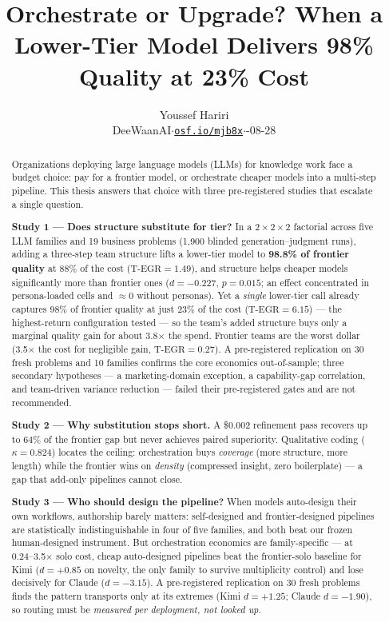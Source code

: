 \documentclass[12pt,a4paper]{article}
\title{\textbf{Orchestrate or Upgrade? When a Lower-Tier Model Delivers
98\% Quality at 23\% Cost}}
\author{Youssef Hariri\\
\small DeeWaanAI\quad $\cdot$\quad \href{https://osf.io/mjb8x}{\texttt{osf.io/mjb8x}}\quad $\cdot$\quad 2026-08-28}
\date{}
\newcommand{\TEGR}{\ensuremath{\text{T-EGR}}}
\begin{document}
\maketitle

\begin{abstract}
\noindent
Organizations deploying large language models (LLMs) for knowledge work face a
budget choice: pay for a frontier model, or orchestrate cheaper models into a
multi-step pipeline. This thesis answers that choice with three pre-registered
studies that escalate a single question.

\smallskip
\noindent\textbf{Study 1 --- Does structure substitute for tier?} In a
$2 \times 2 \times 2$ factorial across five LLM families and 19 business
problems (1{,}900 blinded generation--judgment runs), adding a three-step team
structure lifts a lower-tier model to \textbf{98.8\% of frontier quality} at
88\% of the cost ($\TEGR = 1.49$), and structure helps cheaper models
significantly more than frontier ones ($d = -0.227$, $p = 0.015$; an effect
concentrated in persona-loaded cells and $\approx 0$ without personas). Yet a
\emph{single} lower-tier call already captures 98\% of frontier quality at just
23\% of the cost ($\TEGR = 6.15$) --- the highest-return configuration tested ---
so the team's added structure buys only a marginal quality gain for about
3.8$\times$ the spend. Frontier teams are the worst dollar (3.5$\times$ the cost
for negligible gain, $\TEGR = 0.27$). A pre-registered replication on 30 fresh problems and 10 families confirms the core economics out-of-sample; three secondary hypotheses --- a marketing-domain exception, a capability-gap correlation, and team-driven variance reduction --- failed their pre-registered gates and are not recommended.

\smallskip
\noindent\textbf{Study 2 --- Why substitution stops short.} A \$0.002
refinement pass recovers up to 64\% of the frontier gap but never achieves
paired superiority. Qualitative coding ($\kappa = 0.824$) locates the ceiling:
orchestration buys \emph{coverage} (more structure, more length) while the
frontier wins on \emph{density} (compressed insight, zero boilerplate) --- a gap
that add-only pipelines cannot close.

\smallskip
\noindent\textbf{Study 3 --- Who should design the pipeline?} When models
auto-design their own workflows, authorship barely matters: self-designed and
frontier-designed pipelines are statistically indistinguishable in four of five
families, and both beat our frozen human-designed instrument. But orchestration
economics are family-specific --- at 0.24--3.5$\times$ solo cost, cheap
auto-designed pipelines beat the frontier-solo baseline for Kimi ($d = +0.85$ on
novelty, the only family to survive multiplicity control) and lose decisively for
Claude ($d = -3.15$). A pre-registered replication on 30 fresh problems finds the
pattern transports only at its extremes (Kimi $d = +1.25$; Claude $d = -1.90$),
so routing must be \emph{measured per deployment, not looked up}.


\end{abstract}
\end{document}
